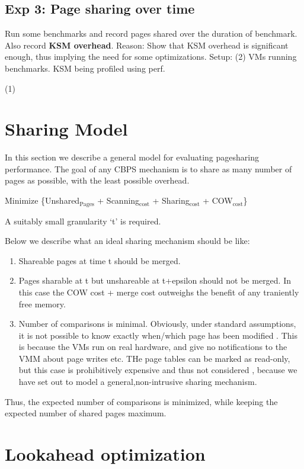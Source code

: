 \documentclass[11pt]{article}
\begin{document}
\subsection{Exp 3: Page sharing over time}
\label{sec-5_9}

Run some benchmarks and record pages shared over the duration of benchmark. Also record \textbf{KSM overhead}.
Reason: Show that KSM overhead is significant enough, thus implying the need for some optimizations.
Setup: (2) VMs running benchmarks. KSM being profiled using perf.

(1)
\section{Sharing Model}
\label{sec-6}

In this section we describe a general model for evaluating pagesharing
performance. 
The goal of any CBPS mechanism is to share as many number of pages as
possible, with the least possible overhead. 

Minimize \{Unshared$_{\mathrm{Pages}}$ + Scanning$_{\mathrm{cost}}$ + Sharing$_{\mathrm{cost}}$ + COW$_{\mathrm{cost}}$\}

A suitably small granularity `t' is required. 

Below we describe what an ideal sharing mechanism should be like:
\begin{enumerate}
\item Shareable pages at time t should be merged.
\item Pages sharable at t but unshareable at t+epsilon should not be
   merged. In this case the COW cost + merge cost outweighs the
   benefit of any traniently free memory.
\item Number of comparisons is minimal. Obviously, under standard
   assumptions, it is not possible to know exactly when/which page has
   been modified . This is because the VMs run on real hardware, and
   give no notifications to the VMM about page writes etc. THe page
   tables can be marked as read-only, but this case is prohibitively
   expensive and thus not considered , because we have set out to
   model a general,non-intrusive sharing mechanism.
\end{enumerate}

Thus, the expected number of comparisons is minimized, while keeping
the expected number of shared pages maximum. 
\section{Lookahead optimization}
\label{sec-7}
\end{document}
